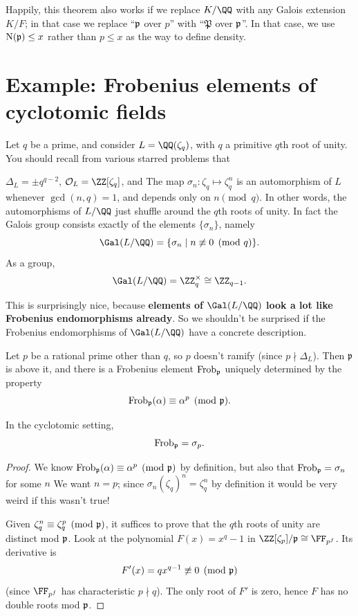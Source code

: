 \begin{remark}
Happily, this theorem also works if we replace $K/\QQ$ with any Galois extension $K/F$;
in that case we replace ``$\mathfrak p$ over $p$'' with ``$\mathfrak P$ over $\mathfrak p$''.
In that case, we use $\operatorname{N}(\mathfrak p) \le x$ rather than $p \le x$ as the way
to define density.
\end{remark}

\section{Example: Frobenius elements of cyclotomic fields}
Let $q$ be a prime, and consider $L = \QQ(\zeta_q)$, with $q$ a primitive $q$th root of unity.
You should recall from various starred problems that
\begin{itemize}
	\ii $\Delta_L = \pm q^{q-2}$,
	\ii $\OO_L = \ZZ[\zeta_q]$, and
	\ii The map $\sigma_n : \zeta_q \mapsto \zeta_q^n$ is an automorphism of $L$ whenever $\gcd(n,q)=1$,
	and depends only on $n \pmod q$.
	In other words, the automorphisms of $L/\QQ$ just shuffle around the $q$th roots of unity.
	In fact the Galois group consists exactly of the elements $\{\sigma_n\}$, namely
	\[ \Gal(L/\QQ) = \{ \sigma_n \mid n \not\equiv 0 \pmod q \}. \]
	As a group, \[ \Gal(L/\QQ) = \Zm q \cong \Zc{q-1}. \]
\end{itemize}
This is surprisingly nice, because \textbf{elements of $\Gal(L/\QQ)$ look
a lot like Frobenius endomorphisms already}.
So we shouldn't be surprised if the Frobenius endomorphisms of $\Gal(L/\QQ)$
have a concrete description.

Let $p$ be a rational prime other than $q$, so $p$ doesn't ramify (since $p \nmid \Delta_L$).
Then $\mathfrak p$ is above it, and there is a Frobenius element $\mathrm{Frob}_\mathfrak p$ uniquely determined by the property
\[ \mathrm{Frob}_\mathfrak p(\alpha) \equiv \alpha^p \pmod{\mathfrak p}. \]

\begin{lemma}
	\label{lem:cyclo_frob}
	In the cyclotomic setting, \[ \mathrm{Frob}_\mathfrak p = \sigma_p. \]
\end{lemma}
\begin{proof}
	We know $\mathrm{Frob}_\mathfrak p(\alpha) \equiv \alpha^p \pmod{\mathfrak p}$ by definition,
	but also that $\mathrm{Frob}_\mathfrak p = \sigma_n$ for some $n$
	We want $n=p$; since $\sigma_n(\zeta_q)^n = \zeta_q^n$ by definition
	it would be very weird if this wasn't true!
	
	Given $\zeta_q^n \equiv \zeta_q^p \pmod{\mathfrak p}$, it suffices to
	prove that the $q$th roots of unity are distinct mod $\mathfrak p$.
	Look at the polynomial $F(x) = x^q-1$ in $\ZZ[\zeta_p]/\pp \cong \FF_{p^f}$.
	Its derivative is \[ F'(x) = qx^{q-1} \not\equiv 0 \pmod{\mathfrak p} \]
	(since $\FF_{p^f}$ has characteristic $p \nmid q$).
	The only root of $F'$ is zero, hence $F$ has no double roots mod $\mathfrak p$.
\end{proof}

